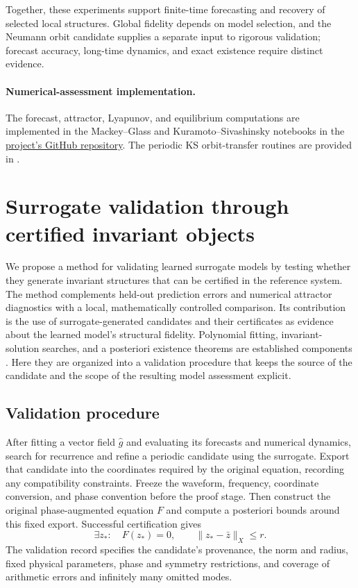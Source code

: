 \documentclass[11pt]{article}
\begin{document}
Together, these experiments support finite-time forecasting and recovery of
selected local structures. Global fidelity depends on model selection, and
the Neumann orbit candidate supplies a separate input to rigorous validation;
forecast accuracy, long-time dynamics, and exact existence require distinct
evidence.

\paragraph{Numerical-assessment implementation.}
The forecast, attractor, Lyapunov, and equilibrium computations are implemented
in the Mackey--Glass and Kuramoto--Sivashinsky notebooks in the
\href{https://github.com/Aloh5/learned-dynamics-cap}{project's GitHub repository}.
The periodic KS orbit-transfer routines are provided in
.

\section{Surrogate validation through certified invariant objects}
\label{sec:assessment}
We propose a method for validating learned surrogate models by testing whether
they generate invariant structures that can be certified in the reference
system. The method complements held-out prediction errors and numerical
attractor diagnostics with a local, mathematically controlled comparison.
Its contribution is the use of surrogate-generated candidates and their
certificates as evidence about the learned model's structural fidelity.
Polynomial fitting, invariant-solution searches, and a posteriori existence
theorems are established components \cite{brunton2016,page2021,framework2017}.
Here they are organized into a validation procedure that keeps the source of
the candidate and the scope of the resulting model assessment explicit.

\subsection{Validation procedure}
After fitting a vector field $\widehat g$ and evaluating its forecasts and
numerical dynamics, search for recurrence and refine a periodic candidate
using the surrogate. Export that candidate into the coordinates required by
the original equation, recording any compatibility constraints. Freeze the
waveform, frequency, coordinate conversion, and phase convention before the
proof stage. Then construct the original phase-augmented equation $F$ and
compute a posteriori bounds around this fixed export. Successful certification
gives
\begin{equation}
 \exists z_*:\quad F(z_*)=0,\qquad \|z_*-\bar z\|_X\leq r.
 \label{eq:object-assessment}
\end{equation}
The validation record specifies the candidate's provenance, the norm and
radius, fixed physical parameters, phase and symmetry restrictions, and
coverage of arithmetic errors and infinitely many omitted modes.
\end{document}
